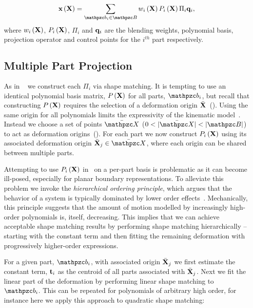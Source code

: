  \begin{equation}
    \defX\left(\refX\right) = \sum_{\prt_i\in\Prts} \bldxi\Pmatxi\Pi_i\vc{q}_i, 
    \label{eq:kinematics}
 \end{equation} where $w_i\left(\mathbf{X}\right)$, $P_i\left(\mathbf{X} \right)$, $\Pi_i$ and $\mathbf{q}_i$ are the blending weights, polynomial basis, projection operator and control points for the $i^{th}$
 part respectively.  
 
 \subsection*{Multiple Part Projection}
As in ~ we construct each $\Pi_i$ via shape matching. 
It is tempting to use an identical polynomial basis matrix, $P\left(\mathbf{X}\right)$ for all parts, $\prt_i$, but recall that constructing $P\left(\mathbf{X}\right)$ requires the selection of a deformation
origin $\bar{\mathbf{X}}$~(). 
Using the same origin for all polynomials limits the expressivity of the kinematic model~\cite{STBS:2011}.
Instead we choose a set of points $\XBs$ ($0 < |\XBs| < |\Prts|$) to act as deformation origins~().
For each part we now construct $P_i\left(\mathbf{X} \right)$ using its associated deformation origin $\bar{\refX}_j\in \XBs$, where each origin can
be shared between multiple parts.

Attempting to use $P_i\left(\mathbf{X} \right)$ in~ on a per-part basis is problematic as it can become ill-posed, especially for planar boundary representations. 
To alleviate this problem we invoke the \emph{hierarchical ordering principle}, which argues that the behavior of a system is typically 
dominated by lower order effects~\cite{li2006regularities}. 
Mechanically, this principle suggests that the amount of motion modelled by increasingly high-order polynomials is, itself, decreasing. 
This implies that we can achieve acceptable shape matching results by performing shape matching hierarchically -- starting with the constant term and then 
fitting the remaining deformation with progressively higher-order expressions. 

For a given part, $\prt_i$, with associated origin $\bar{\mathbf{X}}_j$ we first estimate the constant term, $\mathbf{t}_i$ as the centroid of all parts associated with $\bar{\mathbf{X}}_j$.
Next we fit the linear part of the deformation by performing linear shape matching to $\prt_i$. 
This can be repeated for polynomials of arbitrary high order, for instance here we apply this approach to quadratic shape matching:

